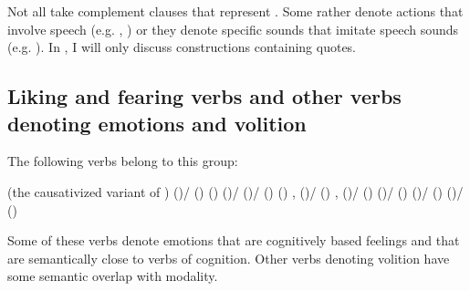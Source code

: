 Not all  take complement clauses that represent . Some rather denote actions that involve speech (e.g. , ) or they denote specific sounds that imitate speech sounds (e.g.  ). In , I will only discuss constructions containing quotes.



\subsection{Liking and fearing verbs and other verbs denoting emotions and volition}
\label{ssec:Liking and fearing verbs and other verbs denoting emotions and volition}

The following verbs belong to this group: 
%
\begin{exe}
	\ex	\label{ex:verbs of liking of fearing}
	\begin{xlist}
		\ex	{}  
		\ex	{}  (the causativized variant of )
		\ex	{} ()\slash{} () 
		\ex	{} () 
		\ex	{} ()\slash{} 
		\ex	{} ()\slash{} () 
		\ex	{} () ,  
		\ex	{} ()\slash{} () ,  
		\ex	{} ()\slash{} () 
		\ex	{} ()\slash  {} () 
		\ex	{} ()\slash{} () 
		\ex	{} ()\slash{} () 
	\end{xlist}
\end{exe}

Some of these verbs denote emotions that are cognitively based feelings and that are semantically close to verbs of cognition. Other verbs denoting volition have some semantic overlap with modality.


